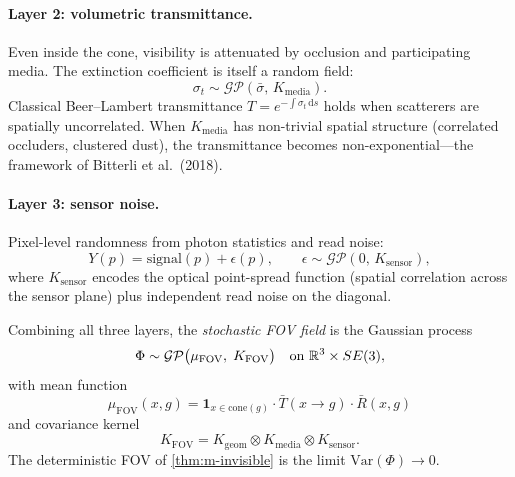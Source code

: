 \paragraph{Layer 2: volumetric transmittance.}
Even inside the cone, visibility is attenuated by occlusion and
participating media.  The extinction coefficient is itself a random
field:
\begin{equation}\label{eq:m-gp-extinction}
  \sigma_t \sim \mathcal{GP}(\bar{\sigma},\, K_{\mathrm{media}}).
\end{equation}
Classical Beer--Lambert transmittance
$T = e^{-\int \sigma_t\,\mathrm{d}s}$ holds when scatterers are
spatially uncorrelated.  When $K_{\mathrm{media}}$ has non-trivial
spatial structure (correlated occluders, clustered dust), the
transmittance becomes non-exponential---the framework of
Bitterli et al.~(2018).

\paragraph{Layer 3: sensor noise.}
Pixel-level randomness from photon statistics and read noise:
\begin{equation}\label{eq:m-gp-sensor}
  Y(p) = \mathrm{signal}(p) + \epsilon(p),
  \qquad
  \epsilon \sim \mathcal{GP}(0,\, K_{\mathrm{sensor}}),
\end{equation}
where $K_{\mathrm{sensor}}$ encodes the optical point-spread
function (spatial correlation across the sensor plane) plus
independent read noise on the diagonal.

\begin{definition}
\label{def:m-stochastic-fov}
Combining all three layers, the \emph{stochastic FOV field} is the
Gaussian process
\begin{equation}\label{eq:m-fov-gp}
  \Phi \sim \mathcal{GP}\bigl(\mu_{\mathrm{FOV}},\;
  K_{\mathrm{FOV}}\bigr)
  \quad \text{on } \mathbb{R}^3 \times SE(3),
\end{equation}
with mean function
\begin{equation}\label{eq:m-fov-mean}
  \mu_{\mathrm{FOV}}(x, g)
  = \mathbf{1}_{x \in \mathrm{cone}(g)}
  \cdot \bar{T}(x \to g)
  \cdot \bar{R}(x, g)
\end{equation}
and covariance kernel
\begin{equation}\label{eq:m-fov-kernel}
  K_{\mathrm{FOV}}
  = K_{\mathrm{geom}} \otimes K_{\mathrm{media}}
    \otimes K_{\mathrm{sensor}}.
\end{equation}
The deterministic FOV of \cref{thm:m-invisible} is the limit
$\mathrm{Var}(\Phi) \to 0$.
\end{definition}


